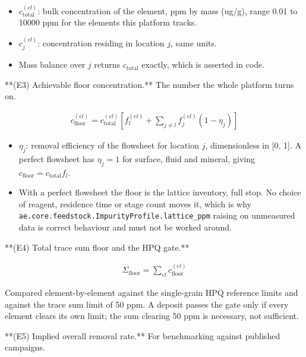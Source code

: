 \documentclass[10pt,a4paper,twoside]{report}
\begin{document}
\begin{itemize}
\item $c_{\text{total}}^{(el)}$: bulk concentration of the element, ppm by mass (ug/g), range 0.01 to 10000 ppm for the elements this platform tracks.
\item $c_j^{(el)}$: concentration residing in location $j$, same units.
\item Mass balance over $j$ returns $c_{\text{total}}$ exactly, which is asserted in code.
\end{itemize}

**(E3) Achievable floor concentration.** The number the whole platform turns on.

\begin{equation*}
\begin{gathered}
c_{\text{floor}}^{(el)} = c_{\text{total}}^{(el)} \left[ f_{l}^{(el)} + \sum_{j \ne l} f_{j}^{(el)} \left( 1 - \eta_{j} \right) \right]
\end{gathered}
\end{equation*}

\begin{itemize}
\item $\eta_j$: removal efficiency of the flowsheet for location $j$, dimensionless in [0, 1]. A perfect flowsheet has $\eta_j = 1$ for surface, fluid and mineral, giving $c_{\text{floor}} = c_{\text{total}} f_l$.
\item With a perfect flowsheet the floor is the lattice inventory, full stop. No choice of reagent, residence time or stage count moves it, which is why \texttt{ae.core.feedstock.ImpurityProfile.lattice\_ppm} raising on unmeasured data is correct behaviour and must not be worked around.
\end{itemize}

**(E4) Total trace sum floor and the HPQ gate.**

\begin{equation*}
\begin{gathered}
\Sigma_{\text{floor}} = \sum_{el} c_{\text{floor}}^{(el)}
\end{gathered}
\end{equation*}

Compared element-by-element against the single-grain HPQ reference limits and against the trace sum limit of 50 ppm. A deposit passes the gate only if every element clears its own limit; the sum clearing 50 ppm is necessary, not sufficient.

**(E5) Implied overall removal rate.** For benchmarking against published campaigns.
\end{document}
